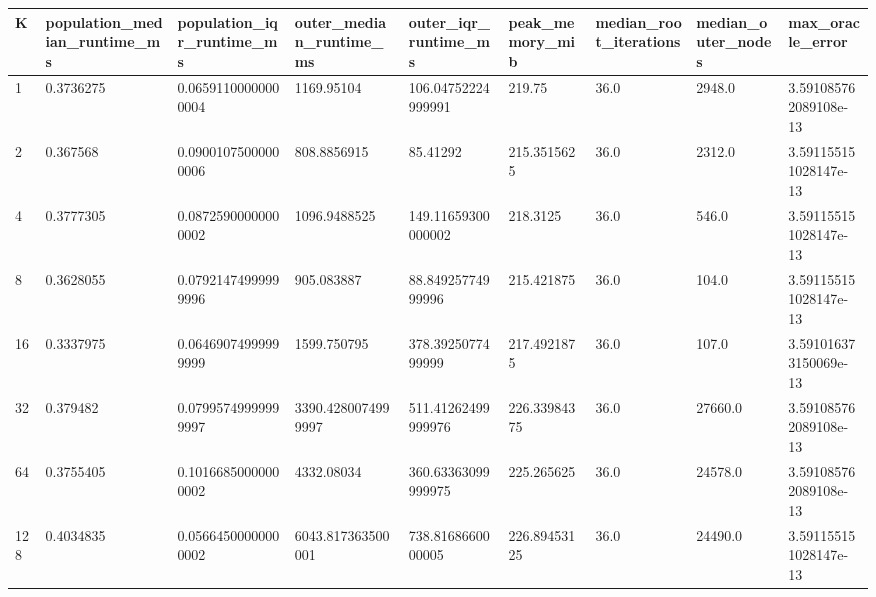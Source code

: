 \begin{tabular}{lllllllll}
\toprule
K & population\_median\_runtime\_ms & population\_iqr\_runtime\_ms & outer\_median\_runtime\_ms & outer\_iqr\_runtime\_ms & peak\_memory\_mib & median\_root\_iterations & median\_outer\_nodes & max\_oracle\_error \\
\midrule
1 & 0.3736275 & 0.06591100000000004 & 1169.95104 & 106.04752224999991 & 219.75 & 36.0 & 2948.0 & 3.591085762089108e-13 \\
2 & 0.367568 & 0.09001075000000006 & 808.8856915 & 85.41292 & 215.3515625 & 36.0 & 2312.0 & 3.591155151028147e-13 \\
4 & 0.3777305 & 0.08725900000000002 & 1096.9488525 & 149.11659300000002 & 218.3125 & 36.0 & 546.0 & 3.591155151028147e-13 \\
8 & 0.3628055 & 0.07921474999999996 & 905.083887 & 88.84925774999996 & 215.421875 & 36.0 & 104.0 & 3.591155151028147e-13 \\
16 & 0.3337975 & 0.06469074999999999 & 1599.750795 & 378.3925077499999 & 217.4921875 & 36.0 & 107.0 & 3.591016373150069e-13 \\
32 & 0.379482 & 0.07995749999999997 & 3390.4280074999997 & 511.41262499999976 & 226.33984375 & 36.0 & 27660.0 & 3.591085762089108e-13 \\
64 & 0.3755405 & 0.10166850000000002 & 4332.08034 & 360.63363099999975 & 225.265625 & 36.0 & 24578.0 & 3.591085762089108e-13 \\
128 & 0.4034835 & 0.05664500000000002 & 6043.817363500001 & 738.8168660000005 & 226.89453125 & 36.0 & 24490.0 & 3.591155151028147e-13 \\
\bottomrule
\end{tabular}
